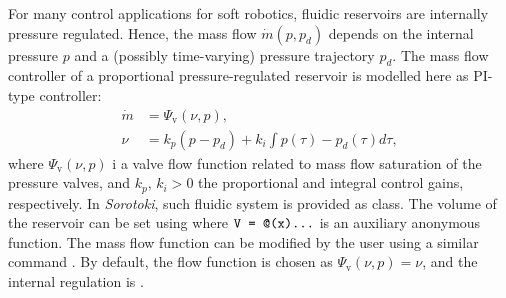 For many control applications for soft robotics, fluidic reservoirs are internally pressure regulated. Hence, the mass flow $\dot{m}(p,p_d)$ depends on the internal pressure $p$ and a (possibly time-varying) pressure trajectory $p_d$. The mass flow controller of a proportional pressure-regulated reservoir is modelled here as PI-type controller:
%
\begin{align}
    \dot{m} & = \Psi_\textrm{v}(\nu,p),                            \\
    \nu     & = k_p(p - p_d) + k_i \int p(\tau) - p_d(\tau) d\tau,
\end{align}
%
where $\Psi_{\textrm{v}}(\nu,p)$ i a valve flow function related to mass flow saturation of the pressure valves, and $k_p,\,k_i >0$ the proportional and integral control gains, respectively. In \textit{Sorotoki}, such fluidic system is provided as  class. The volume of the reservoir can be set using  where $\texttt{V = @(x)...}$ is an auxiliary anonymous function. The mass flow function can be modified by the user using a similar command . By default, the flow function is chosen as $\Psi_{\textrm{v}}(\nu,p) = \nu$, and the internal regulation is . \\



